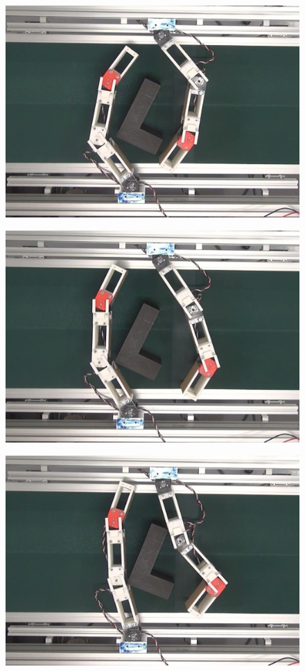 \documentclass[a4paper,twoside,12pt,papersize, dvipdfmx]{iirthesis}
\begin{document}
\begin{figure}[hbt]
\centering
\begin{minipage}{0.249\hsize}
\centering
\includegraphics[width=0.98\hsize]{fig/4-manipulation-result/LShape/2-1.jpg}
\subcaption{}\label{}
\end{minipage}\hfill
\begin{minipage}{0.249\hsize}
\centering
\includegraphics[width=0.98\hsize]{fig/4-manipulation-result/LShape/2-2.jpg}
\subcaption{}\label{}
\end{minipage}\hfill
\begin{minipage}{0.249\hsize}
\centering
\includegraphics[width=0.98\hsize]{fig/4-manipulation-result/LShape/2-3.jpg}

\end{minipage}
\end{figure}
\end{document}
